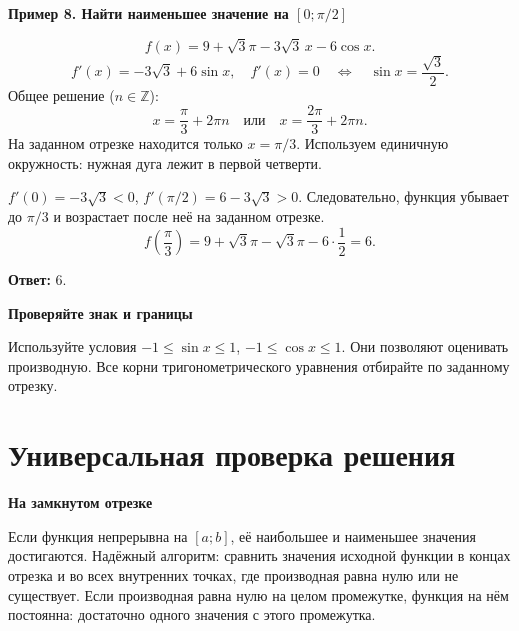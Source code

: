 \documentclass[a4paper,12pt]{article}
\newcommand{\topic}[1]{\section{\textcolor{darkaccent}{#1}}}
\newcommand{\ex}[1]{\par\medskip\textbf{#1}\par\smallskip}
\newcommand{\key}[1]{\par\smallskip\textcolor{darkaccent}{\textbf{#1}}\par\smallskip}
\newcommand{\ans}[1]{\par\textbf{Ответ:} $#1$.}
\begin{document}
\ex{Пример 8. Найти наименьшее значение на $[0;\pi/2]$}
\[f(x)=9+\sqrt3\pi-3\sqrt3\,x-6\cos x.\]
\[f'(x)=-3\sqrt3+6\sin x,\quad f'(x)=0
\quad\Longleftrightarrow\quad \sin x=\frac{\sqrt3}{2}.\]
Общее решение ($n\in\mathbb Z$):
\[x=\frac\pi3+2\pi n\quad\text{или}\quad x=\frac{2\pi}3+2\pi n.\]
На заданном отрезке находится только $x=\pi/3$. Используем единичную окружность: нужная дуга лежит в первой четверти.
\begin{center}
\end{center}
$f'(0)=-3\sqrt3<0$, $f'(\pi/2)=6-3\sqrt3>0$. Следовательно, функция убывает до $\pi/3$ и возрастает после неё на заданном отрезке.
\[f\left(\frac\pi3\right)=9+\sqrt3\pi-\sqrt3\pi-6\cdot\frac12=6.\]
\ans{6}
\key{Проверяйте знак и границы}
Используйте условия $-1\le\sin x\le1$, $-1\le\cos x\le1$. Они позволяют оценивать производную. Все корни тригонометрического уравнения отбирайте по заданному отрезку.
\clearpage
\topic{Универсальная проверка решения}
\key{На замкнутом отрезке}
Если функция непрерывна на $[a;b]$, её наибольшее и наименьшее значения достигаются. Надёжный алгоритм: сравнить значения исходной функции в концах отрезка и во всех внутренних точках, где производная равна нулю или не существует. Если производная равна нулю на целом промежутке, функция на нём постоянна: достаточно одного значения с этого промежутка.
\end{document}
